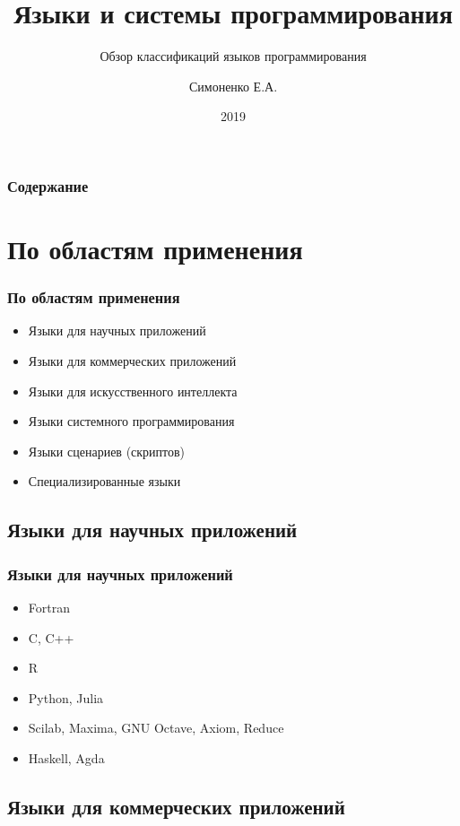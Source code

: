 \documentclass[9pt,pdf]{beamer}
\begin{document}
	
\author{Симоненко Е.А.}
\title{Языки и системы программирования}
\subtitle{Обзор классификаций языков программирования}
\date{2019}
	
\begin{frame}
	\titlepage
\end{frame}
	
\begin{frame}
	\frametitle{Содержание}
	\tableofcontents
\end{frame}

\section{По областям применения}

\begin{frame}
	\frametitle{По областям применения}
	\begin{itemize}
		\item Языки для научных приложений
		\item Языки для коммерческих приложений
		\item Языки для искусственного интеллекта
		\item Языки системного программирования
		\item Языки сценариев (скриптов)
		\item Специализированные языки
	\end{itemize}
\end{frame}

\subsection{Языки для научных приложений}

\begin{frame}
	\frametitle{Языки для научных приложений}
	\begin{itemize}
		\item Fortran
		\item C, C++
		\item R
		\item Python, Julia
		\item Scilab, Maxima, GNU Octave, Axiom, Reduce
		\item Haskell, Agda
	\end{itemize}
\end{frame}

\subsection{Языки для коммерческих приложений}
\end{document}
